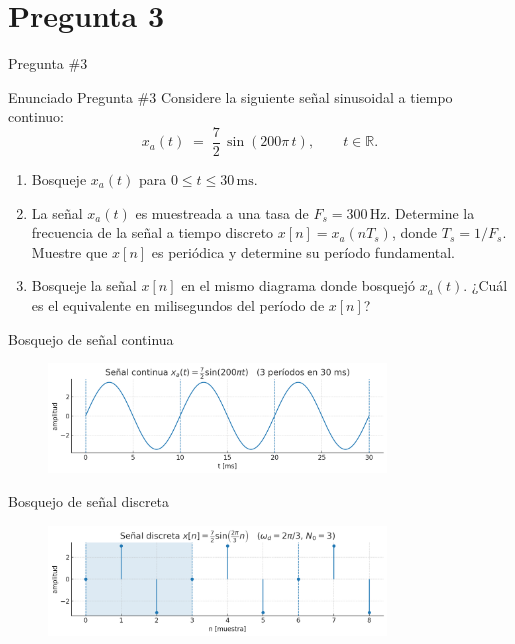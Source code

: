 \documentclass[
    10pt,
    aspectratio=169,
    xcolor={dvipsnames},
    spanish,
    ]{beamer}
\begin{document}
\section{Pregunta 3}
\begin{frame}{Pregunta \#3}
\begin{block}{Enunciado Pregunta \#3}
Considere la siguiente señal sinusoidal a tiempo continuo:
\begin{equation}
  x_a(t) \;=\; \frac{7}{2}\,\sin(200\pi\,t), 
  \qquad t \in \mathbb{R}.
\end{equation}

\begin{enumerate}
  \item Bosqueje \(x_a(t)\) para \(0 \le t \le 30\,\text{ms}\).
  \item La señal \(x_a(t)\) es muestreada a una tasa de \(F_s=300\,\text{Hz}\).
        Determine la frecuencia de la señal a tiempo discreto \(x[n]=x_a(nT_s)\),
        donde \(T_s = 1/F_s\). 
        Muestre que \(x[n]\) es periódica y determine su período fundamental.
  \item Bosqueje la señal \(x[n]\) en el mismo diagrama donde bosquejó \(x_a(t)\).
        ¿Cuál es el equivalente en milisegundos del período de \(x[n]\)?
\end{enumerate}
\end{block}
\end{frame}
\begin{frame}
  \begin{block}{Bosquejo de señal continua}
  \end{block}
  \begin{figure}
    \includegraphics[width=0.8\textwidth]{Auxiliar_1_2.png}
  \end{figure}
\end{frame}
\begin{frame}
  \begin{block}{Bosquejo de señal discreta}
     \end{block}
    \begin{figure}
    \includegraphics[width=0.8\textwidth]{Auxiliar_1_3.png}
  \end{figure}
\end{frame}
\end{document}
